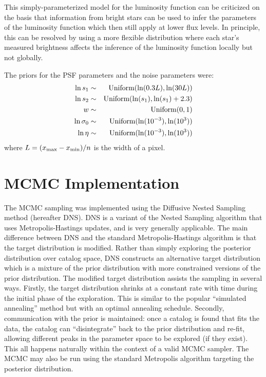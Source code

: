 \documentclass[manuscript]{aastex}
\begin{document}
This simply-parameterized model for the luminosity function can be criticized
on the basis that information from bright stars can be used to infer the
parameters of the luminosity function which then still apply at lower flux
levels. In principle, this can be resolved by using a more flexible distribution
\citep[e.g.][]{2008ApJ...682..874K} where each star's measured brightness
affects the inference of the luminosity function locally but not globally.

The priors for the PSF parameters and the noise parameters were:
\begin{eqnarray}
\ln s_1 &\sim& \textnormal{Uniform}(\ln(0.3L), \ln(30L)) \\
\ln s_2 &\sim& \textnormal{Uniform}(\ln(s_1), \ln(s_1) + 2.3) \\
w &\sim& \textnormal{Uniform}(0, 1)\\
\ln \sigma_0 &\sim& \textnormal{Uniform}(\ln(10^{-3}), \ln(10^{3})) \\
\ln \eta &\sim& \textnormal{Uniform}(\ln(10^{-3}), \ln(10^{3}))
\end{eqnarray}
where $L = (x_{\rm max} - x_{\rm min})/n$ is the width of a pixel.

\section{MCMC Implementation}\label{sec:mcmc}
The MCMC sampling was implemented using the Diffusive Nested Sampling
\citep{dnest} method (hereafter DNS). DNS is a variant of the
Nested Sampling \citep{skilling} algorithm that uses Metropolis-Hastings
updates, and
is very generally applicable. The main difference between DNS and the standard
Metropolis-Hastings algorithm is that the target distribution is modified.
Rather than simply exploring the posterior distribution over catalog space,
DNS constructs an alternative target distribution which is a mixture of the
prior distribution with more constrained versions of the prior distribution.
The modified target distribution assists the sampling in several ways.
Firstly, the target distribution shrinks at a constant rate with time during the
initial phase of the exploration. This is similar to the popular ``simulated
annealing'' method but with an optimal annealing schedule. Secondly,
communication with the prior is maintained: once a catalog is found that
fits the data, the catalog can ``disintegrate'' back to the prior distribution
and re-fit, allowing different peaks in the parameter space to be explored
(if they exist). This all happens naturally within the context of a valid
MCMC sampler. The MCMC may also be run using the standard Metropolis algorithm
targeting the posterior distribution.
\end{document}

